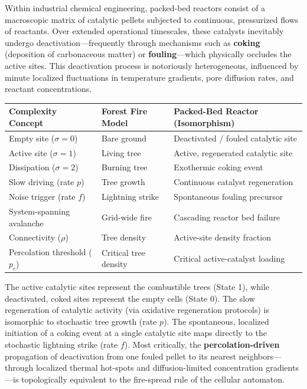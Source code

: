 \documentclass[12pt, a4paper]{article}
\begin{document}
Within industrial chemical engineering, packed-bed reactors consist of a macroscopic matrix of catalytic pellets subjected to continuous, pressurized flows of reactants. Over extended operational timescales, these catalysts inevitably undergo deactivation---frequently through mechanisms such as \textbf{coking} (deposition of carbonaceous matter) or \textbf{fouling}---which physically occludes the active sites. This deactivation process is notoriously heterogeneous, influenced by minute localized fluctuations in temperature gradients, pore diffusion rates, and reactant concentrations.

\begin{center}
\small
\begin{tabular}{p{3.5cm} p{4cm} p{5cm}}
    \toprule
    \textbf{Complexity Concept} & \textbf{Forest Fire Model} & \textbf{Packed-Bed Reactor (Isomorphism)} \\
    \midrule
    Empty site ($\sigma = 0$) & Bare ground & Deactivated / fouled catalytic site \\
    Active site ($\sigma = 1$) & Living tree & Active, regenerated catalytic site \\
    Dissipation ($\sigma = 2$) & Burning tree & Exothermic coking event \\
    Slow driving (rate $p$) & Tree growth & Continuous catalyst regeneration \\
    Noise trigger (rate $f$) & Lightning strike & Spontaneous fouling precursor \\
    System-spanning avalanche & Grid-wide fire & Cascading reactor bed failure \\
    Connectivity ($\rho$) & Tree density & Active-site density fraction \\
    Percolation threshold ($p_c$) & Critical tree density & Critical active-catalyst loading \\
    \bottomrule
\end{tabular}
\end{center}

The active catalytic sites represent the combustible trees (State 1), while deactivated, coked sites represent the empty cells (State 0). The slow regeneration of catalytic activity (via oxidative regeneration protocols) is isomorphic to stochastic tree growth (rate $p$). The spontaneous, localized initiation of a coking event at a single catalytic site maps directly to the stochastic lightning strike (rate $f$). Most critically, the \textbf{percolation-driven} propagation of deactivation from one fouled pellet to its nearest neighbors---through localized thermal hot-spots and diffusion-limited concentration gradients---is topologically equivalent to the fire-spread rule of the cellular automaton.
\end{document}
